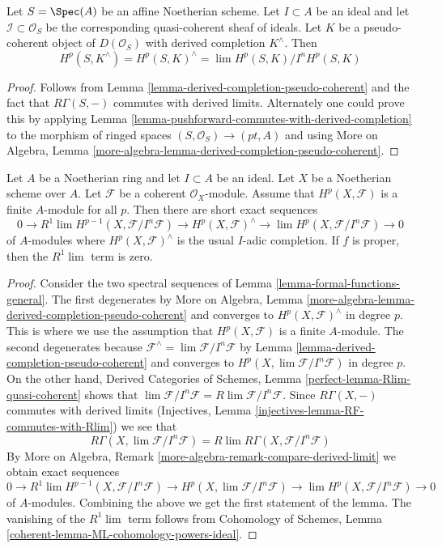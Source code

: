 \begin{lemma}
\label{lemma-sections-derived-completion-pseudo-coherent}
Let $S = \Spec(A)$ be an affine Noetherian scheme. Let $I \subset A$
be an ideal and let $\mathcal{I} \subset \mathcal{O}_S$
be the corresponding quasi-coherent sheaf of ideals. Let $K$ be a
pseudo-coherent object of $D(\mathcal{O}_S)$ with derived completion
$K^\wedge$. Then
$$
H^p(S, K^\wedge) = H^p(S, K)^\wedge = \lim H^p(S, K)/I^nH^p(S, K)
$$
\end{lemma}

\begin{proof}
Follows from Lemma \ref{lemma-derived-completion-pseudo-coherent} and
the fact that $R\Gamma(S, -)$ commutes with derived limits. Alternately
one could prove this
by applying Lemma \ref{lemma-pushforward-commutes-with-derived-completion}
to the morphism of ringed spaces $(S, \mathcal{O}_S) \to (pt, A)$
and using More on Algebra, Lemma
\ref{more-algebra-lemma-derived-completion-pseudo-coherent}.
\end{proof}

\begin{lemma}
\label{lemma-formal-functions}
Let $A$ be a Noetherian ring and let $I \subset A$ be an ideal. Let $X$ be a
Noetherian scheme over $A$. Let $\mathcal{F}$ be a coherent
$\mathcal{O}_X$-module. Assume that $H^p(X, \mathcal{F})$ is
a finite $A$-module for all $p$. Then there are short exact sequences
$$
0 \to R^1\lim H^{p - 1}(X, \mathcal{F}/I^n\mathcal{F}) \to
H^p(X, \mathcal{F})^\wedge \to \lim H^p(X, \mathcal{F}/I^n\mathcal{F}) \to 0
$$
of $A$-modules where $H^p(X, \mathcal{F})^\wedge$ is the usual $I$-adic
completion. If $f$ is proper, then the $R^1\lim$ term is zero.
\end{lemma}

\begin{proof}
Consider the two spectral sequences of
Lemma \ref{lemma-formal-functions-general}.
The first degenerates by More on Algebra, Lemma
\ref{more-algebra-lemma-derived-completion-pseudo-coherent}
and converges to $H^p(X, \mathcal{F})^\wedge$ in degree $p$.
This is where we use the assumption that $H^p(X, \mathcal{F})$ is
a finite $A$-module. The second degenerates because
$\mathcal{F}^\wedge = \lim \mathcal{F}/I^n\mathcal{F}$
by Lemma \ref{lemma-derived-completion-pseudo-coherent}
and converges to $H^p(X, \lim \mathcal{F}/I^n\mathcal{F})$
in degree $p$. On the other hand, Derived Categories of Schemes, Lemma
\ref{perfect-lemma-Rlim-quasi-coherent}
shows that
$\lim \mathcal{F}/I^n\mathcal{F} = R\lim \mathcal{F}/I^n \mathcal{F}$.
Since $R\Gamma(X, -)$ commutes with derived limits
(Injectives, Lemma \ref{injectives-lemma-RF-commutes-with-Rlim})
we see that
$$
R\Gamma(X, \lim \mathcal{F}/I^n\mathcal{F}) =
R\lim R\Gamma(X, \mathcal{F}/I^n\mathcal{F})
$$
By More on Algebra, Remark \ref{more-algebra-remark-compare-derived-limit}
we obtain exact sequences
$$
0 \to
R^1\lim H^{p - 1}(X, \mathcal{F}/I^n\mathcal{F}) \to
H^p(X, \lim \mathcal{F}/I^n\mathcal{F}) \to
\lim H^p(X, \mathcal{F}/I^n\mathcal{F}) \to 0
$$
of $A$-modules. Combining the above we get the first statement of the lemma.
The vanishing of the $R^1\lim$ term follows from
Cohomology of Schemes, Lemma \ref{coherent-lemma-ML-cohomology-powers-ideal}.
\end{proof}

